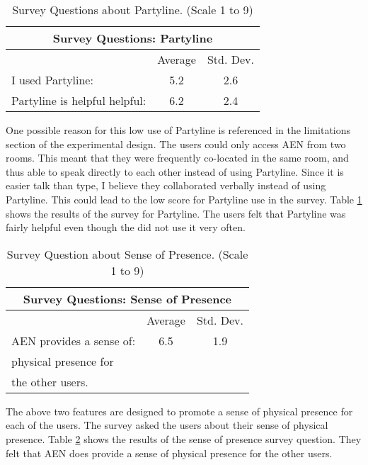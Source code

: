 \small
\begin{table}
  \caption{Survey Questions about Partyline. (Scale 1 to 9)}
  \begin{center}
    \begin{tabular}{|l|c|c|}
      \hline
      \multicolumn{3}{|c|}{\rule[-3mm]{0mm}{8mm}\bf Survey Questions:
      Partyline}\\ \hline
      &Average&Std. Dev.\\ \hline
      I used Partyline:&5.2&2.6\\\hline
      Partyline is helpful helpful:&6.2&2.4\\\hline
    \end{tabular}
  \end{center}
  \label{tab:survey-Partyline}
\end{table}
\normalsize

One possible reason for this low use of Partyline is referenced in the
limitations section of the experimental design.  The users could only
access AEN from two rooms.  This meant that they were frequently co-located
in the same room, and thus able to speak directly to each other instead of
using Partyline.  Since it is easier talk than type, I believe they
collaborated verbally instead of using Partyline.  This could lead to the
low score for Partyline use in the survey.  Table
\ref{tab:survey-Partyline} shows the results of the survey for Partyline.
The users felt that Partyline was fairly helpful even though the did not
use it very often.


\small
\begin{table}[htbp]
  \caption{Survey Question about Sense of Presence. (Scale 1 to 9)}
  \begin{center}
    \begin{tabular}{|l|c|c|}
      \hline
      \multicolumn{3}{|c|}{\rule[-3mm]{0mm}{8mm}\bf Survey Questions:
      Sense of Presence}\\ \hline
      &Average&Std. Dev.\\ \hline
      AEN provides a sense of:&6.5&1.9\\
      physical presence for&&\\
      the other users.&&\\\hline
    \end{tabular}
  \end{center}
  \label{tab:survey-Presence}
\end{table}
\normalsize

The above two features are designed to promote a sense of physical presence
for each of the users.  The survey asked the users about their sense of
physical presence.  Table \ref{tab:survey-Presence} shows the results of
the sense of presence survey question.  They felt that AEN does provide a
sense of physical presence for the other users.

